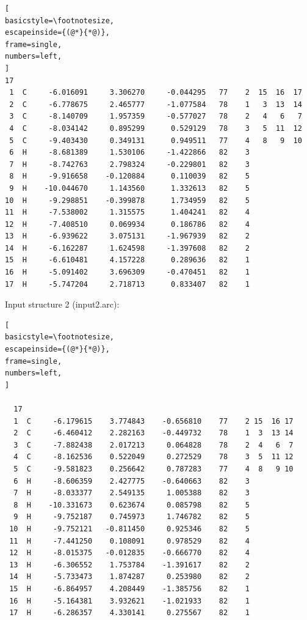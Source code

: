 \documentclass[a4paper,11pt]{scrartcl}
\begin{document}
\begin{itemize}
\begin{lstlisting}[
basicstyle=\footnotesize,
escapeinside={(@*}{*@)},
frame=single,
numbers=left,
]
17
 1  C     -6.016091     3.306270     -0.044295   77    2  15  16  17
 2  C     -6.778675     2.465777     -1.077584   78    1   3  13  14
 3  C     -8.140709     1.957359     -0.577027   78    2   4   6   7
 4  C     -8.034142     0.895299      0.529129   78    3   5  11  12
 5  C     -9.403430     0.349131      0.949511   77    4   8   9  10
 6  H     -8.681389     1.530106     -1.422866   82    3
 7  H     -8.742763     2.798324     -0.229801   82    3
 8  H     -9.916658    -0.120884      0.110039   82    5
 9  H    -10.044670     1.143560      1.332613   82    5
10  H     -9.298851    -0.399878      1.734959   82    5
11  H     -7.538002     1.315575      1.404241   82    4
12  H     -7.408510     0.069934      0.186786   82    4
13  H     -6.939622     3.075131     -1.967939   82    2
14  H     -6.162287     1.624598     -1.397608   82    2
15  H     -6.610481     4.157228      0.289636   82    1
16  H     -5.091402     3.696309     -0.470451   82    1
17  H     -5.747204     2.718713      0.833407   82    1

\end{lstlisting}

Input structure 2 (input2.arc): \newline

\begin{lstlisting}[
basicstyle=\footnotesize,
escapeinside={(@*}{*@)},
frame=single,
numbers=left,
]

  17
  1  C     -6.179615    3.774843    -0.656810    77    2 15  16 17
  2  C     -6.460412    2.282163    -0.449732    78    1  3  13 14
  3  C     -7.882438    2.017213     0.064828    78    2  4   6  7
  4  C     -8.162536    0.522049     0.272529    78    3  5  11 12
  5  C     -9.581823    0.256642     0.787283    77    4  8   9 10
  6  H     -8.606359    2.427775    -0.640663    82    3
  7  H     -8.033377    2.549135     1.005388    82    3
  8  H    -10.331673    0.623674     0.085798    82    5
  9  H     -9.752187    0.745973     1.746782    82    5
 10  H     -9.752121   -0.811450     0.925346    82    5
 11  H     -7.441250    0.108091     0.978529    82    4
 12  H     -8.015375   -0.012835    -0.666770    82    4
 13  H     -6.306552    1.753784    -1.391617    82    2
 14  H     -5.733473    1.874287     0.253980    82    2
 15  H     -6.864957    4.208449    -1.385756    82    1
 16  H     -5.164381    3.932621    -1.021933    82    1
 17  H     -6.286357    4.330141     0.275567    82    1


\end{lstlisting} 


\end{itemize}
\end{document}
